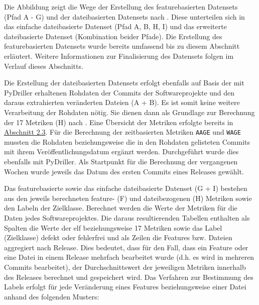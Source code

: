 Die Abbildung zeigt die Wege der Erstellung des featurebasierten Datensets (Pfad A - G) und der dateibasierten Datensets nach \cite{Moser2008}. Diese unterteilen sich in das \glqq einfache\grqq{} dateibasierte Datenset (Pfad A, B, H, I) und das erweiterte dateibasierte Datenset (Kombination beider Pfade). Die Erstellung des featurebasierten Datensets wurde bereits umfassend bis zu diesem Abschnitt erläutert. Weitere Informationen zur Finalisierung des Datensets folgen im Verlauf dieses Abschnitts.

Die Erstellung der dateibasierten Datensets erfolgt ebenfalls auf Basis der mit PyDriller erhaltenen Rohdaten der Commits der Softwareprojekte und den daraus extrahierten veränderten Dateien (A + B). Es ist somit keine weitere Verarbeitung der Rohdaten nötig. Sie dienen dann als Grundlage zur Berechnung der 17 Metriken (H) nach \cite{Moser2008}. Eine Übersicht der Metriken erfolgte bereits in \hyperref[moser-metrics]{Abschnitt 2.3}. Für die Berechnung der zeitbasierten Metriken \texttt{AAGE} und \texttt{WAGE} mussten die Rohdaten beziehungsweise die in den Rohdaten gelisteten Commits mit ihrem Veröffentlichungsdatum ergänzt werden. Durchgeführt wurde dies ebenfalls mit PyDriller. Als Startpunkt für die Berechnung der vergangenen Wochen wurde jeweils das Datum des ersten Commits eines Releases gewählt.

\label{label-explanation}
Das featurebasierte sowie das \glqq einfache\grqq{} dateibasierte Datenset (G + I) bestehen aus den jeweils berechneten feature- (F) und dateibezogenen (H) Metriken sowie den Labeln der Zielklasse. Berechnet werden die Werte der Metriken für die Daten jedes Softwareprojektes. Die daraus resultierenden Tabellen enthalten als Spalten die Werte der elf beziehungsweise 17 Metriken sowie das Label (Zielklasse) \glqq defekt\grqq{} oder \glqq fehlerfrei\grqq{} und als Zeilen die Features bzw. Dateien aggregiert nach Release. Dies bedeutet, dass für den Fall, dass ein Feature oder eine Datei in einem Release mehrfach bearbeitet wurde (d.h. es wird in mehreren Commits bearbeitet), der Durchschnittswert der jeweiligen Metriken innerhalb des Releases berechnet und gespeichert wird. Das Verfahren zur Bestimmung des Labels erfolgt für jede Veränderung eines Features beziehungsweise einer Datei anhand des folgenden Musters:

